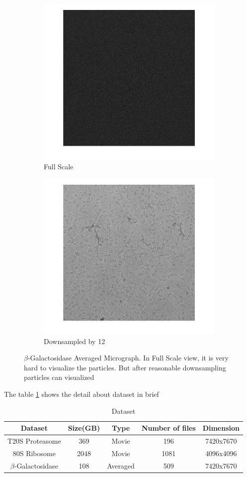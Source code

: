 \documentclass[twoside]{iitbreport}
\begin{document}
\begin{figure}[h]
\centering
\begin{subfigure}{.5\textwidth}
\centering
\includegraphics[width=0.5\linewidth]{EM-10012-micrograph-full_micrograph}
\captionsetup{justification=centering}
\caption{ Full Scale }
\end{subfigure} 
\begin{subfigure}{.48\textwidth}
\centering
\includegraphics[width=0.5\linewidth]{EM-10012-micrograph-full-down-12_micrograph}
\captionsetup{justification=centering}
\caption{Downsampled by 12}
\end{subfigure}
\captionsetup{justification=centering}
\caption{ $\beta$-Galactosidase Averaged Micrograph. In Full Scale view, it is very hard to visualize the particles. But after reasonable downsampling particles can  visualized}
\label{fig:EM-10012-Avg-micrograph}
\end{figure}


The table \ref{tbl:Dataset} shows the detail about dataset in brief
\begin{table}[H]
\centering
  \begin{tabular}{|c|c|c|c|c|} 
    \hline \hline
      Dataset & Size(GB) & Type & Number of files & Dimension  \\ [0.5ex] 
    \hline \hline
    T20S Proteasome & 369 & Movie & 196 & 7420x7670 \\\hline
    80S Ribosome & 2048 & Movie & 1081 & 4096x4096 \\\hline
    $\beta$-Galactosidase & 108 & Averaged & 509 & 7420x7670 \\\hline
    \hline 
  \end{tabular}
\caption{Dataset}
\label{tbl:Dataset}
\end{table}
\end{document}
